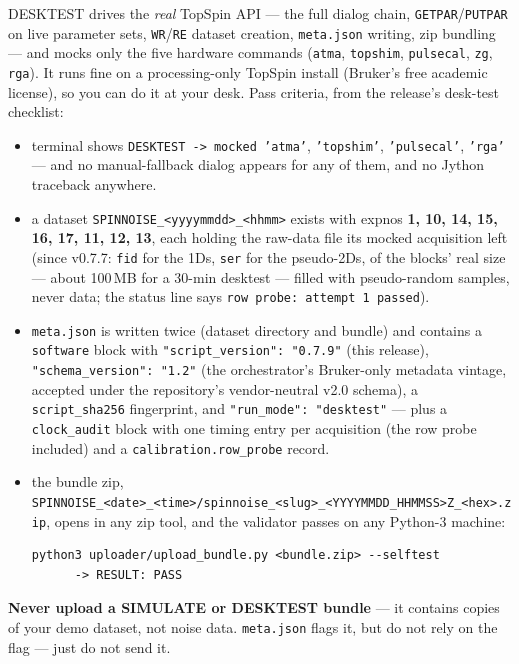 \documentclass[11pt]{article}
\newcommand{\ts}{TopSpin}
\newcommand{\file}[1]{\texttt{#1}}
\begin{document}
DESKTEST drives the \emph{real} \ts{} API --- the full dialog chain,
\texttt{GETPAR}/\texttt{PUTPAR} on live parameter sets, \texttt{WR}/\texttt{RE}
dataset creation, \file{meta.json} writing, zip bundling --- and mocks only
the five hardware commands (\texttt{atma}, \texttt{topshim},
\texttt{pulsecal}, \texttt{zg}, \texttt{rga}). It runs fine on a
processing-only \ts{} install (Bruker's free academic license), so you can do
it at your desk. Pass criteria, from the release's desk-test checklist:
\begin{itemize}
\item terminal shows \texttt{DESKTEST -> mocked 'atma'}, \texttt{'topshim'},
      \texttt{'pulsecal'}, \texttt{'rga'} --- and no manual-fallback dialog
      appears for any of them, and no Jython traceback anywhere.
\item a dataset \file{SPINNOISE\_<yyyymmdd>\_<hhmm>} exists with expnos
      \textbf{1, 10, 14, 15, 16, 17, 11, 12, 13}, each holding the raw-data
      file its mocked acquisition left (since v0.7.7: \file{fid} for the 1Ds,
      \file{ser} for the pseudo-2Ds, of the blocks' real size --- about
      100\,MB for a 30-min desktest --- filled with pseudo-random samples,
      never data; the status line says \texttt{row probe: attempt 1 passed}).
\item \file{meta.json} is written twice (dataset directory and bundle) and
      contains a \texttt{software} block with
      \texttt{"script\_version": "0.7.9"} (this release),
      \texttt{"schema\_version": "1.2"} (the orchestrator's Bruker-only
      metadata vintage, accepted under the repository's vendor-neutral v2.0
      schema), a \texttt{script\_sha256} fingerprint, and
      \texttt{"run\_mode": "desktest"} --- plus a \texttt{clock\_audit} block
      with one timing entry per acquisition (the row probe included) and a
      \texttt{calibration.row\_probe} record.
\item the bundle zip,
      \file{SPINNOISE\_<date>\_<time>/}\allowbreak\file{spinnoise\_<slug>\_<YYYYMMDD\_HHMMSS>Z\_<hex>.zip},
      opens in any zip tool, and the validator passes on any Python-3 machine:
\begin{lstlisting}
python3 uploader/upload_bundle.py <bundle.zip> --selftest
      -> RESULT: PASS
\end{lstlisting}
\end{itemize}
\textbf{Never upload a SIMULATE or DESKTEST bundle} --- it contains copies of
your demo dataset, not noise data. \file{meta.json} flags it, but do not rely
on the flag --- just do not send it.
\end{document}
